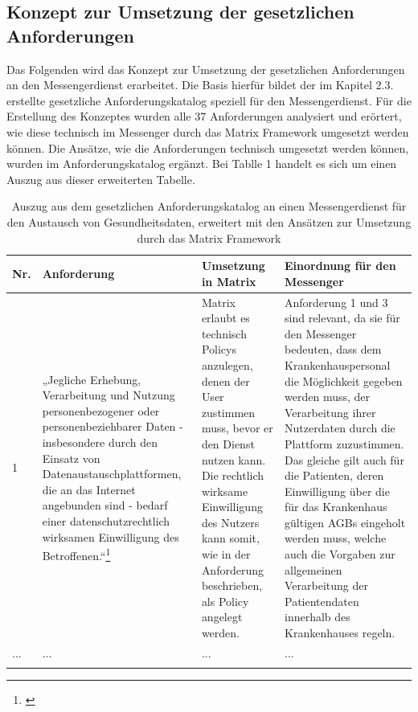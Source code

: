 \subsection{Konzept zur Umsetzung der gesetzlichen Anforderungen}\label{chapter:vdmf}
Das Folgenden wird das Konzept zur Umsetzung der gesetzlichen Anforderungen an den Messengerdienst erarbeitet.
Die Basis hierfür bildet der im Kapitel 2.3. erstellte gesetzliche Anforderungskatalog speziell für den Messengerdienst. Für die Erstellung des Konzeptes wurden alle 37 Anforderungen analysiert und erörtert, wie diese technisch im Messenger durch das Matrix Framework umgesetzt werden können. Die Ansätze, wie die Anforderungen technisch umgesetzt werden können, wurden im Anforderungskatalog ergänzt. Bei Tablle 1 handelt es sich um einen Auszug aus dieser erweiterten Tabelle. 
\newpage
\begin{longtable}{p{0.6cm}|p{4cm}|p{5cm}|p{5cm}}
    \hline
Nr. & Anforderung                                                                                                                                                                                                                                                                                          & Umsetzung in Matrix          & Einordnung für den Messenger                                                                                                                                                                                                                                                                                                                                                                                                                                                                                                                                        \\ \hline
1 &
  „Jegliche Erhebung, Verarbeitung und Nutzung personenbezogener oder personenbeziehbarer Daten - insbesondere durch den Einsatz von Datenaustauschplattformen, die an das Internet angebunden sind - bedarf einer datenschutzrechtlich wirksamen Einwilligung des Betroffenen.“\footnote{\cite[S. 41]{Bundesverband-Gesundheits-IT-e.V.2016}} &
  Matrix erlaubt es technisch Policys anzulegen, denen der User zustimmen muss, bevor er den Dienst nutzen kann. Die rechtlich wirksame Einwilligung des Nutzers kann somit, wie in der Anforderung beschrieben, als Policy angelegt werden. &
  Anforderung 1 und 3 sind relevant, da sie für den Messenger bedeuten, dass dem Krankenhauspersonal die Möglichkeit gegeben werden muss, der Verarbeitung ihrer Nutzerdaten durch die Plattform zuzustimmen. Das gleiche gilt auch für die Patienten, deren Einwilligung über die für das Krankenhaus gültigen AGBs eingeholt werden muss, welche auch die Vorgaben zur allgemeinen Verarbeitung der Patientendaten innerhalb des Krankenhauses regeln.
  \\ \hline
... &
... &
... &
...
  \\ \hline

\caption{Auszug aus dem gesetzlichen Anforderungskatalog an einen Messengerdienst für den Austausch von Gesundheitsdaten, erweitert mit den Ansätzen zur Umsetzung durch das Matrix Framework} 
\end{longtable}

